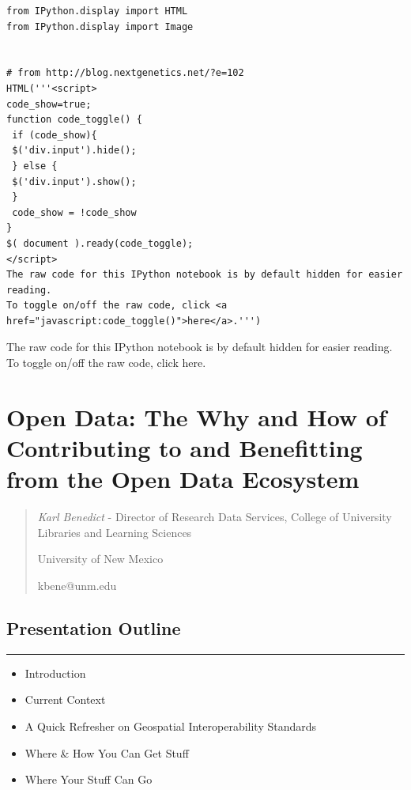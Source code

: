 \begin{verbatim}
from IPython.display import HTML
from IPython.display import Image


# from http://blog.nextgenetics.net/?e=102
HTML('''<script>
code_show=true; 
function code_toggle() {
 if (code_show){
 $('div.input').hide();
 } else {
 $('div.input').show();
 }
 code_show = !code_show
} 
$( document ).ready(code_toggle);
</script>
The raw code for this IPython notebook is by default hidden for easier reading.
To toggle on/off the raw code, click <a href="javascript:code_toggle()">here</a>.''')
\end{verbatim}

The raw code for this IPython notebook is by default hidden for easier
reading. To toggle on/off the raw code, click here.

\section{Open Data: The Why and How of Contributing to and Benefitting
from the Open Data
Ecosystem}\label{open-data-the-why-and-how-of-contributing-to-and-benefitting-from-the-open-data-ecosystem}

\begin{quote}
\emph{Karl Benedict} - Director of Research Data Services, College of
University Libraries and Learning Sciences

University of New Mexico

kbene@unm.edu
\end{quote}

\subsection{Presentation Outline}\label{presentation-outline}

\begin{center}\rule{0.5\linewidth}{\linethickness}\end{center}

\begin{itemize}
\itemsep1pt\parskip0pt
\item
  Introduction
\item
  Current Context
\item
  A Quick Refresher on Geospatial Interoperability Standards
\item
  Where \& How You Can Get Stuff
\item
  Where Your Stuff Can Go
\end{itemize}

